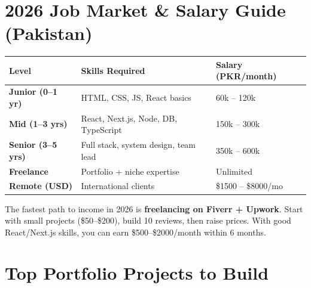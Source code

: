 \documentclass[12pt,a4paper]{article}
\begin{document}
\newpage

\section{2026 Job Market \& Salary Guide (Pakistan)}

\begin{center}
\begin{tabularx}{\textwidth}{|>{\bfseries}l|X|>{\centering\arraybackslash}p{3.5cm}|}
\hline
\rowcolor{FaranDark}
\color{white}\textbf{Level} & \color{white}\textbf{Skills Required} & \color{white}\textbf{Salary (PKR/month)} \\
\hline
Junior (0--1 yr) & HTML, CSS, JS, React basics & 60k -- 120k \\
\hline
\rowcolor{FaranLight}
Mid (1--3 yrs) & React, Next.js, Node, DB, TypeScript & 150k -- 300k \\
\hline
Senior (3--5 yrs) & Full stack, system design, team lead & 350k -- 600k \\
\hline
\rowcolor{FaranLight}
Freelance & Portfolio + niche expertise & Unlimited \\
\hline
Remote (USD) & International clients & \$1500 -- \$8000/mo \\
\hline
\end{tabularx}
\end{center}

\begin{tipbox}
The fastest path to income in 2026 is \textbf{freelancing on Fiverr + Upwork}. Start with small projects (\$50--\$200), build 10 reviews, then raise prices. With good React/Next.js skills, you can earn \$500--\$2000/month within 6 months.
\end{tipbox}

\newpage

\section{Top Portfolio Projects to Build}
\end{document}
